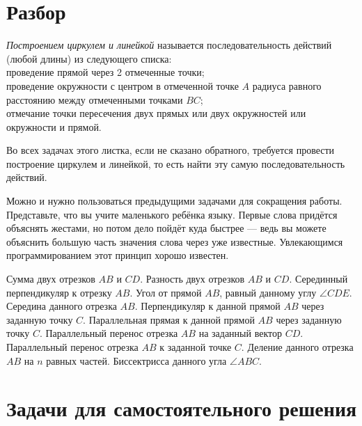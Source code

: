 \documentclass[a4paper,12pt]{article}
\begin{document}
    
    \section{Разбор}
    
     \emph{Построением циркулем и линейкой} называется последовательность действий (любой длины) из следующего списка: \\ 
    \sub проведение прямой через 2 отмеченные точки; \\
    \sub проведение окружности с центром в отмеченной точке $A$ радиуса равного расстоянию между отмеченными точками $BC$; \\
    \sub отмечание точки пересечения двух прямых или двух окружностей или окружности и прямой.
    
    Во всех задачах этого листка, если не сказано обратного, требуется провести построение циркулем и линейкой, то есть найти эту самую последовательность действий. 
    \begin{remark}
        Можно и нужно пользоваться предыдущими задачами для сокращения работы. Представьте, что вы учите маленького ребёнка языку. Первые слова придётся объяснять жестами, но потом дело пойдёт куда быстрее --- ведь вы можете объяснить большую часть значения слова через уже известные. Увлекающимся программированием этот принцип хорошо известен.
    \end{remark}
    
    \problem Сумма двух отрезков $AB$ и $CD$.
    \problem Разность двух отрезков $AB$ и $CD$.
    \problem Серединный перпендикуляр к отрезку $AB$.
    \problem Угол от прямой $AB$, равный данному углу $\angle CDE$.
    \problem Середина данного отрезка $AB$.
    \problem Перпендикуляр к данной прямой $AB$ через заданную точку $C$.
    \problem Параллельная прямая к данной прямой $AB$ через заданную точку $C$.
    \problem Параллельный перенос отрезка $AB$ на заданный вектор $CD$.
    \problem Параллельный перенос отрезка $AB$ к заданной точке $C$.
    \problem Деление данного отрезка $AB$ на $n$ равных частей.
    \problem Биссектрисса данного угла $\angle ABC$.
    
    \section{Задачи для самостоятельного решения}
    
\end{document}
